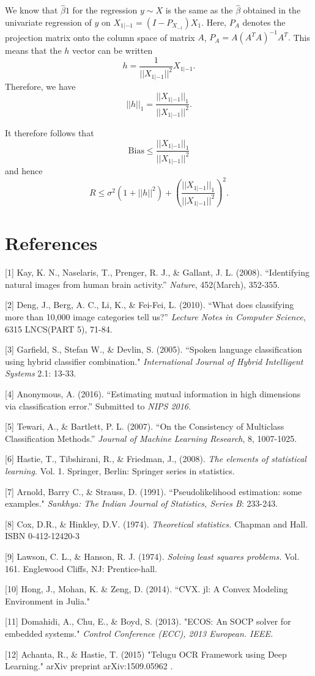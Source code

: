 \documentclass[12pt]{article}
\begin{document}
We know that $\hat{\beta}1$ for the regression $y \sim X$ is the same
as the $\hat{\beta}$ obtained in the univariate regression of $y$ on
$X_{1|-1} = (I-P_{X_{-1}}) X_1$. Here, $P_A$ denotes the projection
matrix onto the column space of matrix $A$, $P_A = A (A^T A)^{-1}
A^T.$ This means that the $h$ vector can be written 
$$ h= \frac{1}{||X_{1|-1}||^2}X_{1|-1}. $$ 
Therefore, we have 
$$ ||h||_1= \frac{||X_{1|-1}||_1}{||X_{1|-1}||^2}. $$ 

It therefore follows that
\[
\text{Bias} \leq \frac{||X_{1|-1}||_1}{||X_{1|-1}||^2}
\]
and hence
\[
R \leq \sigma^2(1 + ||h||^2) + \left(\frac{||X_{1|-1}||_1}{||X_{1|-1}||^2}\right)^2.
\]

\section*{References}

\small

[1] Kay, K. N., Naselaris, T., Prenger, R. J., \& Gallant, J. L. (2008). ``Identifying natural images from human brain activity.'' 
\emph{Nature}, 452(March), 352-355.

[2] Deng, J., Berg, A. C., Li, K., \& Fei-Fei, L. (2010). ``What does classifying more than 10,000 image categories tell us?'' \emph{Lecture Notes in Computer Science}, 6315 LNCS(PART 5), 71-84. 

[3] Garfield, S., Stefan W., \& Devlin, S. (2005). ``Spoken language classification using hybrid classifier combination." 
\emph{International Journal of Hybrid Intelligent Systems} 2.1: 13-33.

[4] Anonymous, A. (2016). ``Estimating mutual information in high dimensions via classification error.''  Submitted to 
\emph{NIPS 2016.}

[5] Tewari, A., \& Bartlett, P. L. (2007). ``On the Consistency of Multiclass Classification Methods.''
\emph{Journal of Machine Learning Research}, 8, 1007-1025.

[6] Hastie, T., Tibshirani, R., \& Friedman, J., (2008). \emph{The elements
of statistical learning.} Vol. 1. Springer, Berlin: Springer series in
statistics.

[7] Arnold, Barry C., \& Strauss, D.  (1991). ``Pseudolikelihood estimation: some examples." \emph{Sankhya: The Indian Journal of Statistics, Series B}: 233-243.

[8] Cox, D.R., \& Hinkley, D.V. (1974). \emph{Theoretical statistics.} Chapman and Hall. ISBN 0-412-12420-3

[9] Lawson, C. L., \& Hanson, R. J. (1974). \emph{Solving least squares problems.} Vol. 161. Englewood Cliffs, NJ: Prentice-hall.

[10] Hong, J., Mohan, K. \& Zeng, D. (2014). ``CVX. jl: A Convex Modeling Environment in Julia."

[11] Domahidi, A., Chu, E., \& Boyd, S. (2013). "ECOS: An SOCP solver for embedded systems." \emph{Control Conference (ECC), 2013 European. IEEE.}

[12] Achanta, R., \& Hastie, T. (2015) "Telugu OCR Framework using Deep Learning." arXiv preprint arXiv:1509.05962 .
\end{document}
